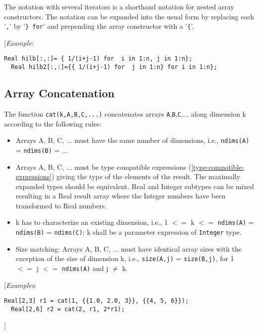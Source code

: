 The notation with several iterators is a shorthand notation for nested
array constructors. The notation can be expanded into the usual form by
replacing each '\lstinline!,!' by '\lstinline!} for!' and prepending the array constructor with
a '\lstinline!{!'.

{[}\emph{Example}:

\begin{lstlisting}[language=modelica]
  Real hilb[:,:]= { 1/(i+j-1) for  i in 1:n, j in 1:n};
  Real hilb2[:,:]={{ 1/(i+j-1) for  j in 1:n} for i in 1:n};
\end{lstlisting}
\subsection{Array Concatenation}


The function \lstinline!cat(k,A,B,C,...)! concatenates arrays
\lstinline!A!,\lstinline!B!,\lstinline!C!,... along
dimension k according to the following rules:

\begin{itemize}
\item
  Arrays A, B, C, ... must have the same number of dimensions, i.e.,
  \lstinline!ndims(A)! = \lstinline!ndims(B)! = ...
\item
  Arrays A, B, C, ... must be type compatible expressions (\autoref{type-compatible-expressions})
  giving the type of the elements of the result. The maximally expanded
  types should be equivalent. Real and Integer subtypes can be mixed
  resulting in a Real result array where the Integer numbers have been
  transformed to Real numbers.
\item
  k has to characterize an existing dimension, i.e., 1 $<=$ k
  $<=$ \lstinline!ndims(A)! = \lstinline!ndims(B)! = \lstinline!ndims(C)!; k shall be a parameter expression of \lstinline!Integer! type.
\item
  Size matching: Arrays A, B, C, ... must have identical array sizes
  with the exception of the size of dimension k, i.e., \lstinline!size(A,j)! =
  \lstinline!size(B,j)!, for 1 $<=$  j $<=$  \lstinline!ndims(A)! and j
  $\neq$ k.
\end{itemize}

{[}\emph{Examples}:

\begin{lstlisting}[language=modelica]
  Real[2,3] r1 = cat(1, {{1.0, 2.0, 3}}, {{4, 5, 6}});
  Real[2,6] r2 = cat(2, r1, 2*r1);
\end{lstlisting}
{]}

